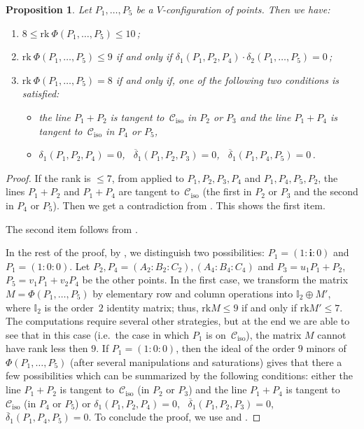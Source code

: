\documentclass[11pt, a4paper, reqno, captions=tableheading,bibliography=totoc]{scrartcl}
\theoremstyle{plain}
\newtheorem{prop}[lemma]{Proposition}
\theoremstyle{definition}
\newcommand{\iso}{\mathcal{C}_{\mathrm{iso}}}
\newcommand{\iii}{\textbf{i}}
\begin{document}
\begin{prop}
\label{proposition:rank_V}
Let $P_1, \dots, P_5$ be a $V$-configuration of
points. Then we have:
\begin{enumerate}
\item $8 \leq \text{rk}\ \Phi(P_1, \dots, P_5) \leq 10$\,;
\item $\text{rk}\ \Phi(P_1, \dots, P_5) \leq 9$ if and only if
$\delta_1(P_1, P_2, P_4) \cdot \delta_2(P_1, \dots, P_5) =0$\,;
\item $\text{rk}\ \Phi(P_1, \dots, P_5) = 8$ if and only if, one of
the following two conditions is satisfied:
%
\begin{itemize}
  \item the line $P_1+P_2$ is tangent to~$\iso$ in $P_2$ or $P_3$
and the line $P_1+P_4$ is tangent to~$\iso$ in $P_4$ or $P_5$,
\item $\delta_1(P_1, P_2, P_4) = 0$, \
$\overline{\delta}_1(P_1, P_2, P_3) = 0$,
\ $\overline{\delta}_1(P_1, P_4, P_5) = 0$\,.
\end{itemize}
%
\end{enumerate}
\end{prop}
\begin{proof}
If the rank is $\leq 7$, from
 applied to $P_1, P_2, P_3, P_4$ and $P_1, P_4, P_5, P_2$,
the lines $P_1+P_2$ and $P_1 + P_4$ are tangent to~$\iso$ (the first in $P_2$ or $P_3$ and the second in $P_4$ or $P_5$).
Then we get a contradiction from \Cref{lemma:special_case_rank_8}.
This shows the first item.

The second item follows from .

In the rest of the proof, by , we distinguish two possibilities:
$P_1 = (1:\iii :0)$ and
$P_1 = (1: 0: 0)$.
Let $P_2, P_4 = (A_2: B_2: C_2), (A_4: B_4: C_4)$ and
$P_3 = u_1P_1+P_2$, $P_5 = v_1P_1+v_2P_4$ be the other points.
In the first case, we transform the matrix $M = \Phi(P_1, \dots, P_5)$ by elementary row and column operations into $\mathbb{I}_2 \oplus M'$, where $\mathbb{I}_2$ is the order~$2$ identity matrix; thus, $\mathrm{rk} M \leq 9$ if and only if $\mathrm{rk} M' \leq 7$.
The computations require several other strategies, but at the end we are
able to see that in this case (i.e.\ the case in which $P_1$ is on~$\iso$), the matrix $M$ cannot have rank less then $9$.
If $P_1 = (1: 0: 0)$, then the ideal of the order $9$ minors of
$\Phi(P_1, \dots, P_5)$ (after several manipulations and saturations)
gives that there a few possibilities which can be summarized by the
following conditions: either the line $P_1+P_2$ is tangent to~$\iso$ (in $P_2$ or $P_3$) and the line $P_1+P_4$ is tangent to~$\iso$ (in $P_4$ or $P_5$) or $\delta_1(P_1, P_2, P_4) = 0$,
\ $\overline{\delta}_1(P_1, P_2, P_3) = 0$,
\ $\overline{\delta}_1(P_1, P_4, P_5) = 0$.
To conclude the proof, we use  and .
\end{proof}
\end{document}
